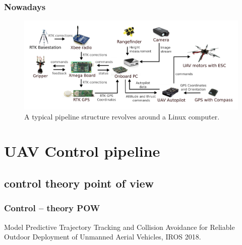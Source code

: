 \documentclass{beamer}
\begin{document}
\begin{frame}
  \frametitle{Nowadays}

  \begin{figure}
    \caption{A typical pipeline structure revolves around a Linux computer.}
    \includegraphics[width=1.0\textwidth]{./fig/components.png}
  \end{figure}

\end{frame}


\section{UAV Control pipeline}
\subsection{control theory point of view}

\begin{frame}
  \frametitle{Control -- theory POW}

  \centering
  \begin{figure}
    \begin{adjustbox}{max totalsize={1.0\textwidth}{.85\textheight}, center}
      
    \end{adjustbox}
  \end{figure}

    \begin{block}{\cite{iros}}
      Model Predictive Trajectory Tracking and Collision Avoidance for Reliable Outdoor Deployment of Unmanned Aerial Vehicles, IROS 2018.
    \end{block}

\end{frame}
\end{document}
